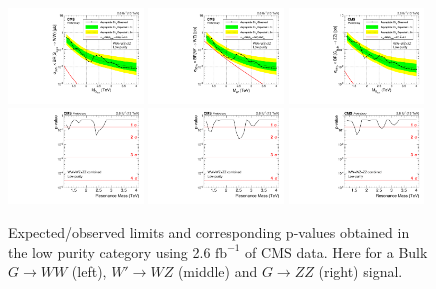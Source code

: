 \begin{figure}[h!]
\centering
\includegraphics[width=0.32\textwidth]{figures/analysis/search1/AN-15-211/limits/brazilianFlag_BulkWW_VVLP_new_combined_purity_13TeV_wPDF.pdf}
\includegraphics[width=0.32\textwidth]{figures/analysis/search1/AN-15-211/limits/brazilianFlag_WZ_VVLP_new_combined_purity_13TeV_wPDF.pdf}
\includegraphics[width=0.32\textwidth]{figures/analysis/search1/AN-15-211/limits/brazilianFlag_BulkZZ_VVLP_new_combined_purity_13TeV_wPDF.pdf}\\
\includegraphics[width=0.32\textwidth]{figures/analysis/search1/AN-15-211/pvalues/pvalue_BulkWWinVVnew_low_purity.pdf}
\includegraphics[width=0.32\textwidth]{figures/analysis/search1/AN-15-211/pvalues/pvalue_WZinVVnew_low_purity.pdf}
\includegraphics[width=0.32\textwidth]{figures/analysis/search1/AN-15-211/pvalues/pvalue_BulkZZinVVnew_low_purity.pdf}
\caption{Expected/observed limits and corresponding p-values obtained in the low purity category using 2.6 $\textrm{fb}^{-1}$ of CMS data. Here for a Bulk $G\rightarrow WW$ (left), $W'\rightarrow WZ$ (middle) and $G\rightarrow ZZ$ (right) signal.}
\label{fig:searchI:Limits_LP}
\end{figure}


